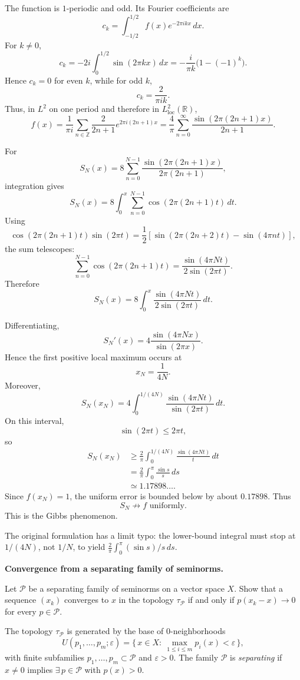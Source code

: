 \begin{solution}
The function is \(1\)-periodic and odd. Its Fourier coefficients are
\[
c_k=\int_{-1/2}^{1/2}f(x)e^{-2\pi ikx}\,dx.
\]
For \(k\neq0\),
\[
c_k
=
-2i\int_0^{1/2}\sin(2\pi kx)\,dx
=
-\frac{i}{\pi k}\bigl(1-(-1)^k\bigr).
\]
Hence \(c_k=0\) for even \(k\), while for odd \(k\),
\[
c_k=\frac{2}{\pi i k}.
\]
Thus, in \(L^2\) on one period and therefore in \(L^2_{\mathrm{loc}}(\mathbb R)\),
\[
\boxed{
f(x)
=
\frac{1}{\pi i}
\sum_{n\in\mathbb Z}
\frac{2}{2n+1}e^{2\pi i(2n+1)x}
=
\frac4\pi
\sum_{n=0}^{\infty}
\frac{\sin(2\pi(2n+1)x)}{2n+1}.
}
\]

For
\[
S_N(x)
=
8\sum_{n=0}^{N-1}
\frac{\sin(2\pi(2n+1)x)}
{2\pi(2n+1)},
\]
integration gives
\[
\boxed{
S_N(x)
=
8\int_0^x
\sum_{n=0}^{N-1}
\cos(2\pi(2n+1)t)\,dt.
}
\]
Using
\[
\cos(2\pi(2n+1)t)\sin(2\pi t)
=
\frac12
\left[
\sin(2\pi(2n+2)t)-\sin(4\pi nt)
\right],
\]
the sum telescopes:
\[
\sum_{n=0}^{N-1}\cos(2\pi(2n+1)t)
=
\frac{\sin(4\pi Nt)}{2\sin(2\pi t)}.
\]
Therefore
\[
\boxed{
S_N(x)
=
8\int_0^x
\frac{\sin(4\pi Nt)}
{2\sin(2\pi t)}\,dt.
}
\]

Differentiating,
\[
S_N'(x)
=
4\frac{\sin(4\pi Nx)}{\sin(2\pi x)}.
\]
Hence the first positive local maximum occurs at
\[
x_N=\frac1{4N}.
\]
Moreover,
\[
S_N(x_N)
=
4\int_0^{1/(4N)}
\frac{\sin(4\pi Nt)}{\sin(2\pi t)}\,dt.
\]
On this interval,
\[
\sin(2\pi t)\le2\pi t,
\]
so
\[
\begin{aligned}
S_N(x_N)
&\ge
\frac2\pi
\int_0^{1/(4N)}
\frac{\sin(4\pi Nt)}{t}\,dt\\
&=
\frac2\pi
\int_0^\pi
\frac{\sin s}{s}\,ds\\
&\simeq1.17898\ldots.
\end{aligned}
\]
Since \(f(x_N)=1\), the uniform error is bounded below by about \(0.17898\). Thus
\[
\boxed{S_N\not\to f\text{ uniformly}.}
\]
This is the Gibbs phenomenon.

The original formulation has a limit typo: the lower-bound integral must stop at \(1/(4N)\),
not \(1/N\), to yield \(\frac2\pi\int_0^\pi(\sin s)/s\,ds\).
\end{solution}


\begin{problem}[CP-II-0368]
\label{prob:cp-ii-0368}
\textbf{Convergence from a separating family of seminorms.}

\hspace*{1.5em}Let $\mathcal P$ be a separating family of seminorms on a vector space $X$.
	Show that a sequence $(x_k)$ converges to $x$ in the topology $\tau_{\mathcal P}$
	if and only if $p(x_k-x)\to0$ for every $p\in\mathcal P$.

	The topology $\tau_{\mathcal P}$ is generated by the base of $0$-neighborhoods
	\[
	U(p_1,\dots,p_m;\varepsilon)
	= \{\,x\in X:\ \max_{1\le i\le m} p_i(x)<\varepsilon\,\},
	\]
	with finite subfamilies $p_1,\dots,p_m\subset\mathcal P$ and $\varepsilon>0$.
	The family $\mathcal P$ is \emph{separating} if $x\neq0$ implies
	$\exists\,p\in\mathcal P$ with $p(x)>0$.
\end{problem}

